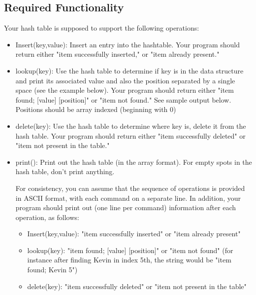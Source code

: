 \documentclass[times, 12pt]{article}
\begin{document}
\subsection*{Required Functionality}
Your hash table is supposed to support the following operations:\\
\begin{itemize}
    \item Insert(key,value): Insert an entry into the hashtable. Your program should return either "item successfully inserted," or "item already present."\\
    
    \item lookup(key): Use the hash table to determine if key is in the data structure and print its associated value and also the position separated by a single space (see the example below).
    Your program should return either "item found; [value] [position]" or "item not found." See sample output below. Positions should be array indexed (beginning with 0)\\
    
    \item delete(key): Use the hash table to determine where key is, delete it from the hash table. Your program should return either "item successfully deleted" or "item not present in the table."\\
    
    \item print(): Print out the hash table (in the array format). For empty spots in the hash table, don't print anything.
    
    For consistency, you can assume that the sequence of operations is provided in ASCII format,
    with each command on a separate line. In addition, your program should print out (one line per
    command) information after each operation, as follows:
    
    \begin{itemize}
        \item Insert(key,value): "item successfully inserted" or "item already present"
        
        \item lookup(key): "item found; [value] [position]" or "item not found"
        (for instance after finding Kevin in index 5th, the string would be "item found; Kevin 5")
        
        \item delete(key): "item successfully deleted" or "item not present in the table"
        

\end{itemize}
\end{itemize}
\end{document}
